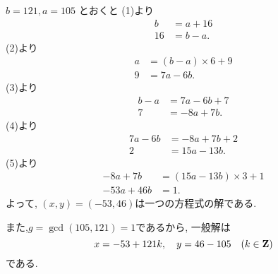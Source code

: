 \begin{enumerate}[6.1]
  $b = 121, a = 105$ とおくと (1)より
  \begin{align*}
    b  & = a + 16 \\
    16 & = b - a.
  \end{align*}
  (2)より
  \begin{align*}
    a &= (b - a) \times 6 + 9 \\
    9 &= 7a - 6b.
  \end{align*}
  (3)より
  \begin{align*}
    b - a &= 7a - 6b + 7 \\
    7 &= -8a + 7b.
  \end{align*}
  (4)より
  \begin{align*}
    7a - 6b &= -8a + 7b + 2 \\
    2 &= 15a - 13b.
  \end{align*}
  (5)より
  \begin{align*}
    -8a + 7b &= (15a - 13b) \times 3 + 1 \\
    -53a + 46b &= 1.
  \end{align*}
  よって, $(x, y) = (-53, 46)$は一つの方程式の解である.

  また,$g = \gcd(105, 121) = 1$であるから, 一般解は
  \[
    x = -53 + 121k, \quad
    y = 46 - 105 \quad
    (k \in \mathbf{Z})
  \]
  である.
\end{enumerate} %

